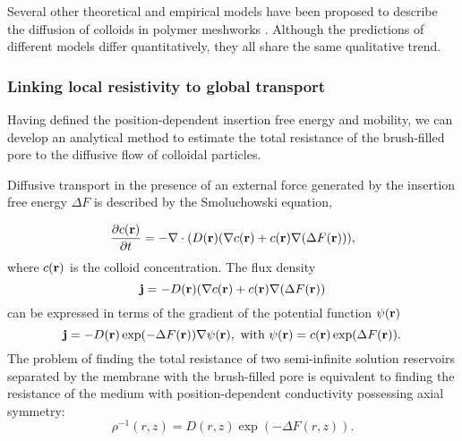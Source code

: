 \documentclass[12pt, a4paper]{article}
\begin{document}
Several other theoretical and empirical models have been proposed to describe the diffusion of colloids in polymer meshworks \cite{Schweizer2003,Kohli2012,Holyst2009,Phillies1988}.
Although the predictions of different models differ quantitatively, they all share the same qualitative trend.



\subsubsection{Linking local resistivity to global transport}


Having defined the position-dependent insertion free energy and mobility, we can develop an analytical method to estimate the total resistance of the brush-filled pore to the diffusive flow of colloidal particles.

Diffusive transport in the presence of an external force generated by the insertion free energy $\Delta F$ is described by the Smoluchowski equation,

\begin{equation}
    \frac{\partial c(\bold r)}{\partial t}=-{\bold \nabla}\cdot (D(\bold r)({\bold \nabla}c({\bold r})+c({\bold r}){\bold \nabla}(\Delta F({\bold  r}))),
    \label{eq:Smoluch}
\end{equation}
where $c(\bold r)$ is the colloid concentration. The flux density 
\begin{equation}
    \bold j=- D(\bold r)({\bold \nabla}c({\bold r})+c({\bold r}){\bold \nabla}(\Delta F({\bold  r}))
    \label{eq:j}
\end{equation}
can be expressed in terms of the gradient of the potential function $\psi(\bold r)$
\begin{equation}
    \bold j=- D(\bold r) \exp(-\Delta F({\bold  r}))  {\bold \nabla} \psi(\bold r), \text{ with } \psi(\bold r)=c(\bold r)\exp(\Delta F(\bold r)).
    \label{eq:psi}
\end{equation}
The problem of finding the total resistance of two semi-infinite solution reservoirs separated by the membrane with the brush-filled pore is equivalent to finding the resistance of the medium with position-dependent conductivity possessing axial symmetry:
\begin{equation}
    \rho^{-1} (r,z)= D(r,z)\exp(-\Delta F(r,z)).
    \label{eq:rho}
\end{equation}
\end{document}
